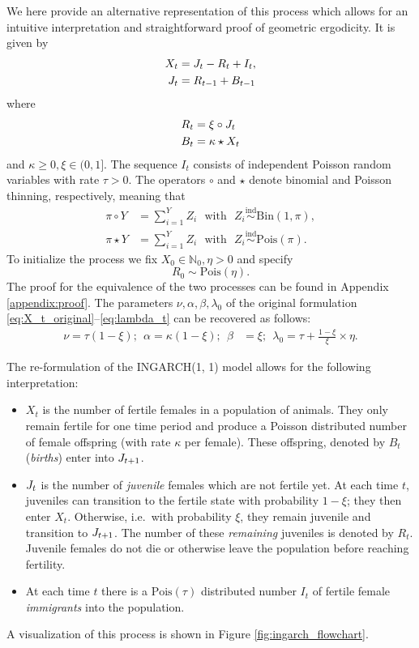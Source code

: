 \documentclass[10pt,a4paper]{article}
\begin{document}
We here provide an alternative representation of this process which allows for an intuitive interpretation and straightforward proof of geometric ergodicity. It is given by
\begin{align}
X_t & = J_t - R_t + I_t,\label{eq:X_t}\\
J_t & = R_{t - 1} + B_{t - 1}\label{eq:juv_t}
\end{align}
where
\begin{align}
R_t & = \xi \circ J_{t}\label{eq:R_t}\\
B_t & = \kappa \star X_t \label{eq:B_t}
\end{align}
and $\kappa \geq 0, \xi \in (0, 1]$. The sequence $I_t$ consists of independent Poisson random variables with rate $\tau > 0$. The operators $\circ$ and $\star$ denote binomial and Poisson thinning, respectively, meaning that
\begin{align*}
\pi \circ Y & = \sum_{i = 1}^Y Z_i \ \ \ \text{with} \ \ \ Z_i \stackrel{\text{ind}}{\sim} \text{Bin}(1, \pi), \\
\pi \star Y & = \sum_{i = 1}^Y Z_i \ \ \ \text{with} \ \ \ Z_i \stackrel{\text{ind}}{\sim} \text{Pois}(\pi).
\end{align*}
To initialize the process we fix $X_0 \in \mathbb{N}_0, \eta > 0$ and specify
$$
R_0 \sim \text{Pois}\left(\eta \right).
$$
The proof for the equivalence of the two processes can be found in Appendix \ref{appendix:proof}. The parameters $\nu, \alpha, \beta, \lambda_0$ of the original formulation \eqref{eq:X_t_original}--\eqref{eq:lambda_t} can be recovered as follows:
\begin{align*}
\nu = \tau(1 - \xi);\ \
\alpha = \kappa(1 - \xi);\ \
\beta & = \xi; \ \
\lambda_0 = \tau + \frac{1 - \xi}{\xi} \times \eta.
\end{align*}


The re-formulation of the INGARCH(1, 1) model allows for the following interpretation:
\begin{itemize}
\item $X_t$ is the number of fertile females in a population of animals. They only remain fertile for one time period and produce a Poisson distributed number of female offspring (with rate $\kappa$ per female). These offspring, denoted by $B_t$ (\textit{births}) enter into $J_{t + 1}$.
\item $J_t$ is the number of \textit{juvenile} females which are not fertile yet. At each time $t$, juveniles can transition to the fertile state with probability $1 - \xi$; they then enter $X_t$. Otherwise, i.e.\ with probability $\xi$, they remain juvenile and transition to $J_{t + 1}$. The number of these \textit{remaining} juveniles is denoted by $R_t$. Juvenile females do not die or otherwise leave the population before reaching fertility.
\item At each time $t$ there is a $\text{Pois}(\tau)$ distributed number $I_t$ of fertile female \textit{immigrants} into the population.
\end{itemize}
A visualization of this process is shown in Figure \ref{fig:ingarch_flowchart}.
\end{document}
